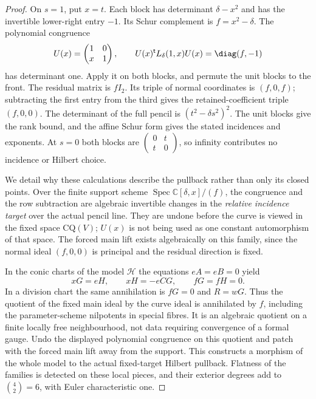\documentclass[11pt,reqno]{amsart}
\numberwithin{equation}{section}
\theoremstyle{definition}\newtheorem{definition}[theorem]{Definition}
\theoremstyle{remark}\newtheorem{remark}[theorem]{Remark}
\newcommand{\C}{\mathbb C}\newcommand{\Q}{\mathbb Q}
\DeclareMathOperator{\Spec}{Spec}\DeclareMathOperator{\PGL}{PGL}
\begin{document}
\begin{proof}
On $s=1$, put $x=t$. Each block has determinant $\delta-x^2$ and
has the invertible lower-right entry $-1$. Its Schur complement is
$f=x^2-\delta$. The polynomial congruence
\[
 U(x)=\begin{pmatrix}1&0\\x&1\end{pmatrix},\qquad
 U(x)^{\mathsf t}L_\delta(1,x)U(x)=\diag(f,-1)
\]
has determinant one. Apply it on both blocks, and permute the unit
blocks to the front. The residual matrix is $fI_2$. Its triple of
normal coordinates is $(f,0,f)$; subtracting the first entry from
the third gives the retained-coefficient triple $(f,0,0)$.
The determinant of the full pencil is $(t^2-\delta s^2)^2$.
The unit blocks give the rank bound, and the affine Schur form
gives the stated incidences and exponents. At $s=0$ both blocks are
$\left(\begin{smallmatrix}0&t\\t&0\end{smallmatrix}\right)$,
so infinity contributes no incidence or Hilbert choice.

We detail why these calculations describe the pullback rather than
only its closed points. Over the finite support scheme
$\Spec\C[\delta,x]/(f)$, the congruence and the row subtraction are
algebraic invertible changes in the \emph{relative incidence target}
over the actual pencil line. They are undone before the curve is
viewed in the fixed space $\mathrm{CQ}(V)$; $U(x)$ is not being
used as one constant automorphism of that space. The forced main
lift exists algebraically on this family, since the normal ideal
$(f,0,0)$ is principal and the residual direction is fixed.

In the conic charts of the model $\mathcal H$ the equations
$eA=eB=0$ yield
\[
           xG=eH,\qquad xH=-eCG,\qquad fG=fH=0.
\]
In a division chart the same annihilation is $fG=0$ and $R=wG$.
Thus the quotient of the fixed main ideal by the curve ideal is
annihilated by $f$, including the parameter-scheme nilpotents in
special fibres. It is an algebraic quotient on a finite locally
free neighbourhood, not data requiring convergence of a formal
gauge. Undo the displayed polynomial congruence on this quotient
and patch with the forced main lift away from the support. This
constructs a morphism of the whole model to the actual fixed-target
Hilbert pullback. Flatness of the families is detected on these
local pieces, and their exterior degrees add to
$\binom42=6$, with Euler characteristic one.


\end{proof}
\end{document}
